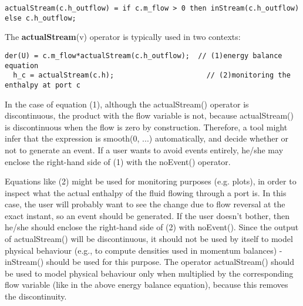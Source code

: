 \begin{lstlisting}[language=modelica]
actualStream(c.h_outflow) = if c.m_flow > 0 then inStream(c.h_outflow) else c.h_outflow;
\end{lstlisting}

\begin{nonnormative}
The \textbf{actualStream}(v) operator is typically used in two
contexts:
\begin{lstlisting}[language=modelica]
  der(U) = c.m_flow*actualStream(c.h_outflow);  // (1)energy balance equation
  h_c = actualStream(c.h);                      // (2)monitoring the enthalpy at port c
\end{lstlisting}
In the case of equation (1), although the actualStream() operator
is discontinuous, the product with the flow variable is not, because
actualStream() is discontinuous when the flow is zero by construction.
Therefore, a tool might infer that the expression is smooth(0, ...)
automatically, and decide whether or not to generate an event. If a user
wants to avoid events entirely, he/she may enclose the right-hand side
of (1) with the noEvent() operator.

Equations like (2) might be used for monitoring purposes (e.g.
plots), in order to inspect what the actual enthalpy of the fluid
flowing through a port is. In this case, the user will probably want to
see the change due to flow reversal at the exact instant, so an event
should be generated. If the user doesn't bother, then he/she should
enclose the right-hand side of (2) with noEvent(). Since the output of
actualStream() will be discontinuous, it should not be used by itself to
model physical behaviour (e.g., to compute densities used in momentum
balances) - inStream() should be used for this purpose. The operator
actualStream() should be used to model physical behaviour only when
multiplied by the corresponding flow variable (like in the above energy
balance equation), because this removes the discontinuity.
\end{nonnormative}
